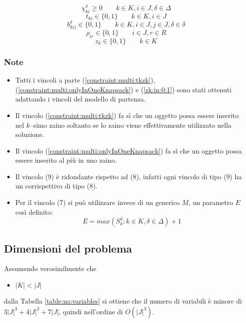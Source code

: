 \documentclass{scrartcl}
\begin{document}
\begin{equation}
\chi_{ki}^\delta \geq 0 \quad \quad k \in K, i \in J, \delta \in \Delta
\end{equation}
\begin{equation}
t_{ki} \in \{0,1\} \quad \quad k \in K, i \in J
\end{equation}
\begin{equation}
b_{kij}^\delta \in \{0,1\} \quad \quad k \in K, i \in J, j \in J, \delta \in \delta
\end{equation}
\begin{equation}
\rho_{ir} \in \{0,1\} \quad\quad i \in J, r \in R
\end{equation}
\begin{equation}
\label{zk:in:0:1}
z_k \in \{0,1\} \quad \quad k \in K
\end{equation}

\subsubsection{Note}
\begin{itemize}
\item Tutti i vincoli a parte (\ref{constraint:multi:tkzk}), (\ref{constraint:multi:onlyInOneKnapsack}) e (\ref{zk:in:0:1}) sono stati ottenuti adattando i vincoli del modello di partenza.
\item Il vincolo (\ref{constraint:multi:tkzk}) fa sì che un oggetto possa essere inserito nel $k$--simo zaino soltanto se lo zaino viene effettivamente utilizzato nella soluzione.
\item Il vincolo (\ref{constraint:multi:onlyInOneKnapsack}) fa sì che un oggetto possa essere inserito al più in uno zaino. 
\item Il vincolo (9) è ridondante rispetto ad (8), infatti ogni vincolo di tipo (9) ha un corrispettivo di tipo (8).
\item Per il vincolo (7) si può utilizzare invece di un generico $M$, un parametro $E$ così definito:
$$
E = max(S_k^\delta : k \in K, \delta \in \Delta) + 1
$$ 
\end{itemize}

\subsection{Dimensioni del problema}
\label{sec:orig:dimensioneDelProblema}
Assumendo verosimilmente che 
\begin{itemize}
	\item $|K| < |J|$
\end{itemize}  
dalla Tabella \ref{table:no:variables}
si ottiene che il numero di variabili è minore di $3|J|^3 + 4|J|^2 + 7|J|$, quindi
nell'ordine di $O(|J|^3)$.
\end{document}
